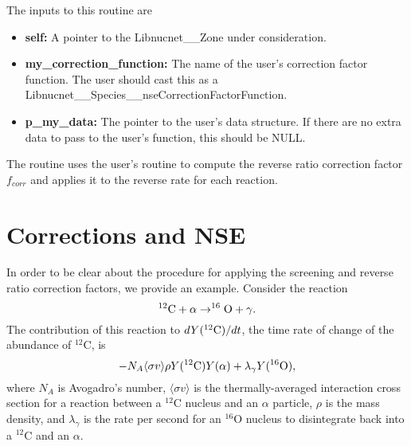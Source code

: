 \documentclass{article}    %
\begin{document}
The inputs to this routine are
\begin{itemize}

\item {\bf self:}  A pointer to the Libnucnet\_\_Zone under consideration.

\item {\bf my\_correction\_function:}  The name of the user's correction
factor function.  The user should cast this as a
Libnucnet\_\_Species\_\_nseCorrectionFactorFunction.

\item {\bf p\_my\_data:}  The pointer to the user's data structure.  If there
are no extra data to pass to the user's function, this should be NULL.
\end{itemize}

The routine uses the user's routine to compute the reverse ratio correction
factor $f_{corr}$ and applies it to the reverse rate for each reaction. 

\section{Corrections and NSE}
In order to be clear about the procedure for applying the screening and
reverse ratio correction factors, we provide an example.  Consider the
reaction
\begin{equation}
^{12}{\rm C} + \alpha \to ^{16}{\rm O} + \gamma. \label{eq:reaction}
\end{equation}
The contribution of this reaction
to $dY({^{12}{\rm C}})/dt$, the time rate of change of the abundance
of $^{12}$C, 
is
\begin{equation}
-N_A \langle \sigma v \rangle \rho Y(^{12}{\rm C}) Y(\alpha ) + \lambda_\gamma
Y(^{16}{\rm O}),  \label{eq:diffeq}
\end{equation}
where $N_A$ is Avogadro's number, $\langle \sigma v \rangle$ is the
thermally-averaged interaction cross section for a reaction between 
a $^{12}$C nucleus and an $\alpha$ particle, $\rho$ is the mass density,
and $\lambda_\gamma$ is the rate per second for an $^{16}$O nucleus to
disintegrate back into a $^{12}$C and an $\alpha$.
\end{document}
